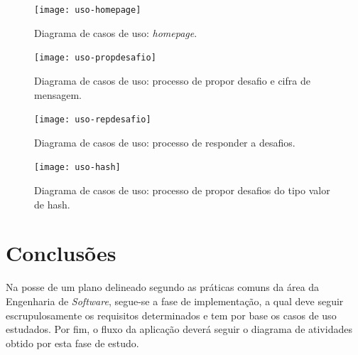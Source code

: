 \begin{figure}[!htbp]
	\centering
	\texttt{[image: uso-homepage]}
	\caption[Diagrama de casos de uso: \emph{homepage}]{Diagrama de casos de uso: \emph{homepage}.}
	\label{fig::casos-uso-homepage}
\end{figure}

\begin{figure}[!htbp]
	\centering
	\texttt{[image: uso-propdesafio]}
	\caption[Diagrama de casos de uso: processo de propor desafio e cifra de mensagem]{Diagrama de casos de uso: processo de propor desafio e cifra de mensagem.}
	\label{fig::casos-uso-propdesafio}
\end{figure}

\begin{figure}[!htbp]
	\centering
	\texttt{[image: uso-repdesafio]}
	\caption[Diagrama de casos de uso: processo de responder a desafios]{Diagrama de casos de uso: processo de responder a desafios.}
	\label{fig::casos-uso-repdesafio}
\end{figure}

\begin{figure}[!htbp]
	\centering
	\texttt{[image: uso-hash]}
	\caption[Diagrama de casos de uso: processo de propor desafios do tipo valor de hash]{Diagrama de casos de uso: processo de propor desafios do tipo valor de hash.}
	\label{fig::casos-uso-hash}
\end{figure}


\section{Conclusões}
\label{sec::engsoft:conclusao}

Na posse de um plano delineado segundo as práticas comuns da área da Engenharia de \textit{Software}, segue-se a fase de implementação, a qual deve seguir escrupulosamente os requisitos determinados e tem por base os casos de uso estudados. Por fim, o fluxo da aplicação deverá seguir o diagrama de atividades obtido por esta fase de estudo.

